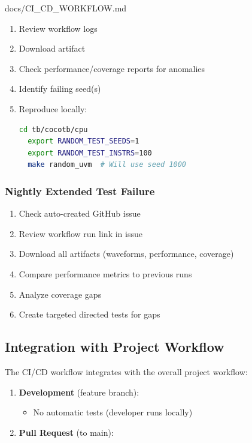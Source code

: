 \begin{relocated}{docs/CI_CD_WORKFLOW.md}
\begin{enumerate}
\def\labelenumi{\arabic{enumi}.}
\tightlist
\item
  Review workflow logs
\item
  Download  artifact
\item
  Check performance/\allowbreak{}coverage reports for anomalies
\item
  Identify failing seed(s)
\item
  Reproduce locally:

  \begin{lstlisting}[language=bash]
  cd tb/cocotb/cpu
  export RANDOM_TEST_SEEDS=1
  export RANDOM_TEST_INSTRS=100
  make random_uvm  # Will use seed 1000
  \end{lstlisting}
\end{enumerate}

\subsubsection{Nightly Extended Test Failure}\label{um:flow:ci-cd-workflow:nightly-extended-test-failure}

\begin{enumerate}
\def\labelenumi{\arabic{enumi}.}
\tightlist
\item
  Check auto-created GitHub issue
\item
  Review workflow run link in issue
\item
  Download all artifacts (waveforms, performance, coverage)
\item
  Compare performance metrics to previous runs
\item
  Analyze coverage gaps
\item
  Create targeted directed tests for gaps
\end{enumerate}

\subsection{Integration with Project Workflow}\label{um:flow:ci-cd-workflow:integration-with-project-workflow}

The CI/CD workflow integrates with the overall project workflow:

\begin{enumerate}
\def\labelenumi{\arabic{enumi}.}
\item
  \textbf{Development} (feature branch):

  \begin{itemize}
  \tightlist
  \item
    No automatic tests (developer runs locally)
  \end{itemize}
\item
  \textbf{Pull Request} (to main):


\end{enumerate}
\end{relocated}
